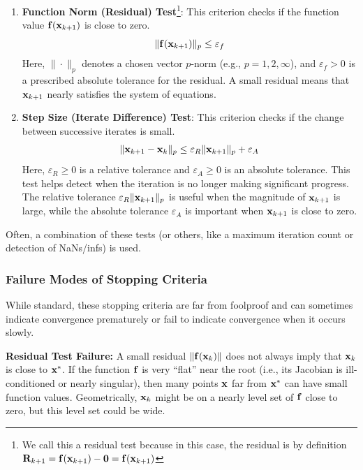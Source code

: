 \begin{enumerate}
    \item \textbf{Function Norm (Residual) Test}\footnote{We call this a residual test because in this case, the residual is by definition $\mathbf{R}_{k+1} = \mathbf{f}(\mathbf{x}_{k+1}) - \mathbf{0} = \mathbf{f}(\mathbf{x}_{k+1})$}: This criterion checks if the function value $\mathbf{f}(\mathbf{x}_{k+1})$ is close to zero.
    \begin{equation}
        \|\mathbf{f}(\mathbf{x}_{k+1})\|_p \le \varepsilon_f
    \end{equation}
    Here, $\|\cdot\|_p$ denotes a chosen vector $p$-norm (e.g., $p=1, 2, \infty$), and $\varepsilon_f > 0$ is a prescribed absolute tolerance for the residual. A small residual means that $\mathbf{x}_{k+1}$ nearly satisfies the system of equations.

    \item \textbf{Step Size (Iterate Difference) Test}: This criterion checks if the change between successive iterates is small.
    \begin{equation}
        \|\mathbf{x}_{k+1} - \mathbf{x}_k\|_p \le \varepsilon_R \|\mathbf{x}_{k+1}\|_p + \varepsilon_A
    \end{equation}
    Here, $\varepsilon_R \ge 0$ is a relative tolerance and $\varepsilon_A \ge 0$ is an absolute tolerance. This test helps detect when the iteration is no longer making significant progress. The relative tolerance $\varepsilon_R \|\mathbf{x}_{k+1}\|_p$ is useful when the magnitude of $\mathbf{x}_{k+1}$ is large, while the absolute tolerance $\varepsilon_A$ is important when $\mathbf{x}_{k+1}$ is close to zero.
\end{enumerate}
Often, a combination of these tests (or others, like a maximum iteration count or detection of NaNs/infs) is used.

\subsubsection{Failure Modes of Stopping Criteria}
While standard, these stopping criteria are far from foolproof and can sometimes indicate convergence prematurely or fail to indicate convergence when it occurs slowly.

\textbf{Residual Test Failure:}
A small residual $\|\mathbf{f}(\mathbf{x}_k)\|$ does not always imply that $\mathbf{x}_k$ is close to $\mathbf{x}^*$. If the function $\mathbf{f}$ is very ``flat'' near the root (i.e., its Jacobian is ill-conditioned or nearly singular), then many points $\mathbf{x}$ far from $\mathbf{x}^*$ can have small function values. Geometrically, $\mathbf{x}_k$ might be on a nearly level set of $\mathbf{f}$ close to zero, but this level set could be wide.

